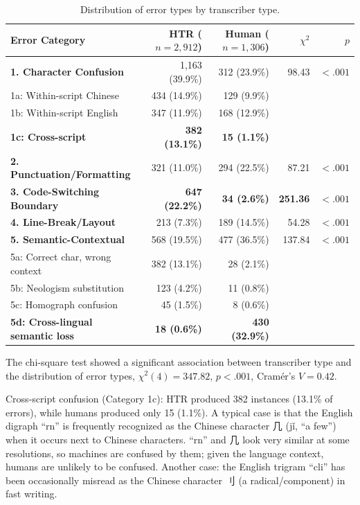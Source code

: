 \documentclass[final]{anthology-ch} %
\begin{document}
\begin{table}[h]
  \centering
  \small
  \begin{tabular}{lrrrr}
    \toprule
    Error Category & HTR ($n=2{,}912$) & Human ($n=1{,}306$) & $\chi^2$ & $p$ \\
    \midrule
    \textbf{1. Character Confusion}      & 1,163 (39.9\%) & 312 (23.9\%) & 98.43 & $<.001$ \\
    \quad 1a: Within-script Chinese      & 434 (14.9\%)  & 129 (9.9\%)  &  &  \\
    \quad 1b: Within-script English      & 347 (11.9\%)  & 168 (12.9\%) &  &  \\
    \quad \textbf{1c: Cross-script}      & \textbf{382 (13.1\%)} & \textbf{15 (1.1\%)} &  &  \\
    \textbf{2. Punctuation/Formatting}   & 321 (11.0\%)  & 294 (22.5\%) & 87.21 & $<.001$ \\
    \textbf{3. Code-Switching Boundary}  & \textbf{647 (22.2\%)} & \textbf{34 (2.6\%)} & \textbf{251.36} & $\mathbf{<.001}$ \\
    \textbf{4. Line-Break/Layout}        & 213 (7.3\%)   & 189 (14.5\%) & 54.28 & $<.001$ \\
    \textbf{5. Semantic-Contextual}      & 568 (19.5\%)  & 477 (36.5\%) & 137.84 & $<.001$ \\
    \quad 5a: Correct char, wrong context & 382 (13.1\%) & 28 (2.1\%)   &  &  \\
    \quad 5b: Neologism substitution     & 123 (4.2\%)   & 11 (0.8\%)   &  &  \\
    \quad 5c: Homograph confusion        & 45 (1.5\%)    & 8 (0.6\%)    &  &  \\
    \quad \textbf{5d: Cross-lingual semantic loss} & \textbf{18 (0.6\%)} & \textbf{430 (32.9\%)} &  &  \\
    \bottomrule
  \end{tabular}
  \caption{Distribution of error types by transcriber type.}
  \label{tab:error-types}
\end{table}

The chi-square test showed a significant association between transcriber type and the distribution of error types, $\chi^2(4) = 347.82$, $p < .001$, Cramér's $V = 0.42$.

Cross-script confusion (Category 1c): HTR produced 382 instances (13.1\% of errors), while humans produced only 15 (1.1\%). A typical case is that the English digraph \enquote{rn} is frequently recognized as the Chinese character 几 (jǐ, \enquote{a few}) when it occurs next to Chinese characters. \enquote{rn} and 几 look very similar at some resolutions, so machines are confused by them; given the language context, humans are unlikely to be confused. Another case: the English trigram \enquote{cli} has been occasionally misread as the Chinese character 刂 (a radical/component) in fast writing.
\end{document}
